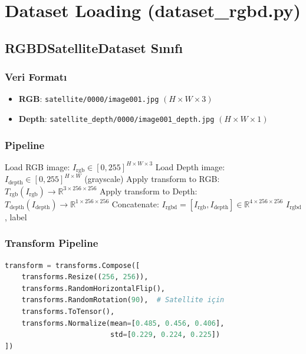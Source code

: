 \documentclass[12pt,a4paper]{article}
\begin{document}
\section{Dataset Loading (dataset\_rgbd.py)}

\subsection{RGBDSatelliteDataset Sınıfı}

\subsubsection{Veri Formatı}
\begin{itemize}
    \item \textbf{RGB}: \texttt{satellite/0000/image001.jpg} $(H \times W \times 3)$
    \item \textbf{Depth}: \texttt{satellite\_depth/0000/image001\_depth.jpg} $(H \times W \times 1)$
\end{itemize}

\subsubsection{Pipeline}
\begin{algorithm}[H]
\caption{RGBD Data Loading}
\begin{algorithmic}[1]
\STATE Load RGB image: $I_{\text{rgb}} \in [0, 255]^{H \times W \times 3}$
\STATE Load Depth image: $I_{\text{depth}} \in [0, 255]^{H \times W}$ (grayscale)
\STATE Apply transform to RGB: $T_{\text{rgb}}(I_{\text{rgb}}) \to \mathbb{R}^{3 \times 256 \times 256}$
\STATE Apply transform to Depth: $T_{\text{depth}}(I_{\text{depth}}) \to \mathbb{R}^{1 \times 256 \times 256}$
\STATE Concatenate: $I_{\text{rgbd}} = [I_{\text{rgb}}, I_{\text{depth}}] \in \mathbb{R}^{4 \times 256 \times 256}$
\RETURN $I_{\text{rgbd}}$, label
\end{algorithmic}
\end{algorithm}

\subsubsection{Transform Pipeline}
\begin{lstlisting}[language=Python]
transform = transforms.Compose([
    transforms.Resize((256, 256)),
    transforms.RandomHorizontalFlip(),
    transforms.RandomRotation(90),  # Satellite için
    transforms.ToTensor(),
    transforms.Normalize(mean=[0.485, 0.456, 0.406], 
                         std=[0.229, 0.224, 0.225])
])
\end{lstlisting}
\end{document}
